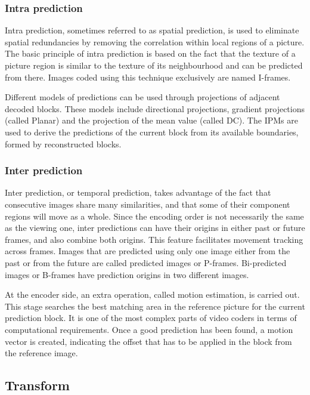 \documentclass[11pt,a4paper,openright,twoside]{book}
\numberwithin{equation}{section} %
\numberwithin{figure}{section} %
\numberwithin{table}{section} %
\begin{document}
\subsubsection{Intra prediction}
\label{ssub:intra_prediction}

Intra prediction, sometimes referred to as spatial prediction, is used to
eliminate spatial redundancies by removing the correlation within local
regions of a picture.
The basic principle of intra prediction is based on the fact that the texture
of a picture region is similar to the texture of its neighbourhood and can be
predicted from there.
Images coded using this technique exclusively are named I-frames.

Different models of predictions can be used through projections of adjacent
decoded blocks.
These models include directional projections, gradient projections (called
Planar) and the projection of the mean value (called DC).
The \acp{IPM} are used to derive the predictions of the current block from its
available boundaries, formed by reconstructed blocks.

\subsubsection{Inter prediction}
\label{ssub:inter_prediction}

Inter prediction, or temporal prediction, takes advantage of the fact that
consecutive images share many similarities, and that some of their component
regions will move as a whole.
Since the encoding order is not necessarily the same as the viewing one, inter
predictions can have their origins in either past or future frames, and also
combine both origins.
This feature facilitates movement tracking across frames.
Images that are predicted using only one image either from the past or from
the future are called predicted images or P-frames.
Bi-predicted images or B-frames have prediction origins in two different
images.

At the encoder side, an extra operation, called motion estimation, is
carried out.
This stage searches the best matching area in the reference picture for the
current prediction block.
It is one of the most complex parts of video coders in terms of computational
requirements.
Once a good prediction has been found, a motion vector is created, indicating
the offset that has to be applied in the block from the reference image.

\subsection{Transform}
\label{sub:transform}
\end{document}
